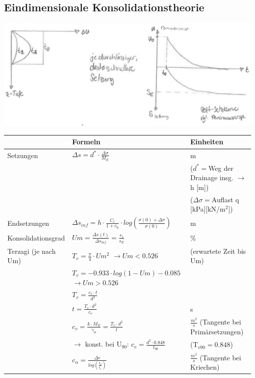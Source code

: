 	\begin{minipage}{\linewidth}

	\subsection{Eindimensionale Konsolidationstheorie}
	
		\includegraphics[width=0.7\linewidth]{images/Kons3PorenspTiefZeitSetzungsDiagramm.PNG} \\	
	\begin{tabular}{l|l|l}
				& Formeln											& Einheiten \\ \hline \hline

	Setzungen	& $\Delta s=d^*\cdot \frac{\Delta \sigma}{M_E}$	& m \\
				&													&($d^*=$Weg der Drainage insg. $\rightarrow$ h [m]) \\
				&													&($\Delta\sigma=$Auflast q [kPa][kN/m$^2$]) \\
	Endsetzungen& $\Delta s_{inf}=h\cdot \frac{C_c}{1+e_0}\cdot log\left(\frac{\sigma(0)+\Delta\sigma}{\sigma(0)}\right)$	& m \\ \hline
				
	Konsolidationsgrad & $Um=\frac{\Delta s(t)}{\Delta s_{inf}} = \frac{s_1}{s_E}	$	& \% \\ \hline		

	Terzagi
	(je nach Um)& $T_v=\frac{\pi}{4}\cdot Um^2$ $\rightarrow Um<0.526$& (erwartete Zeit bis Um)\\
				& $T_v=-0.933\cdot log(1-Um)-0.085$ $\rightarrow Um>0.526$& \\
				& $T_v=\frac{c_v \cdot t}{d^2}$						& \\
				& $t=\frac{T_v \cdot d^2}{c_v}$						& s \\
				& $c_v=\frac{k \cdot M_E}{\gamma_w} =\frac{T_v\cdot d^2}{t}$									&$\frac{m^2}{s}$ (Tangente bei Primärsetzungen) \\
				& $\rightarrow$ konst. bei U$_{90}$: $c_v=\frac{d^2 \cdot 0.848}{t_{90}}$& (T$_{v90}=0.848$)\\
				& $c_{\alpha} = \frac{\Delta e}{log \left(\frac{t_2}{t_1}\right)}$ 				& $\frac{m^2}{s}$ (Tangente bei Kriechen)\\ \hline


\end{tabular}
\end{minipage}
